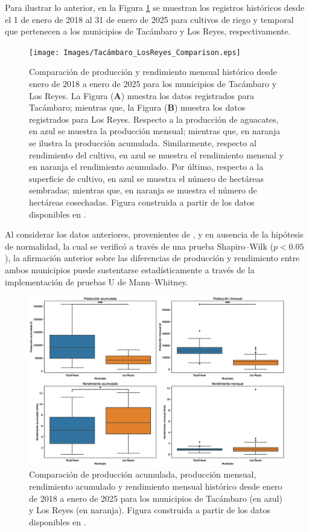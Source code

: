 Para ilustrar lo anterior, en la Figura \ref{fig:Produccion_comparison_TimeSeries} se muestran los registros históricos desde el 1 de enero de 2018 al 31 de enero de 2025 para cultivos de riego y temporal que pertenecen a los municipios de Tacámbaro y Los Reyes, respectivamente.\\

\begin{figure}[!ht]
    \centering
    \texttt{[image: Images/Tacámbaro\_LosReyes\_Comparison.eps]}
    \caption{Comparación de producción y rendimiento mensual histórico desde enero de 2018 a enero de 2025 para los municipios de Tacámbaro y Los Reyes. La Figura (\textbf{A}) muestra los datos registrados para Tacámbaro; mientras que, la Figura (\textbf{B}) muestra los datos registrados para Los Reyes. Respecto a la producción de aguacates, en azul se muestra la producción mensual; mientras que, en naranja se ilustra la producción acumulada. Similarmente, respecto al rendimiento del cultivo, en azul se muestra el rendimiento mensual y en naranja el rendimiento acumulado. Por último, respecto a la superficie de cultivo, en azul se muestra el número de hectáreas sembradas; mientras que, en naranja se muestra el número de hectáreas cosechadas. Figura construida a partir de los datos disponibles en \cite{AvanceSiembrasCosechas}.}
    \label{fig:Produccion_comparison_TimeSeries}
\end{figure}

Al considerar los datos anteriores, provenientes de \cite{AvanceSiembrasCosechas}, y en ausencia de la hipótesis de normalidad, la cual se verificó a través de una prueba Shapiro--Wilk ($p <0.05$), la afirmación anterior sobre las diferencias de producción y rendimiento entre ambos municipios puede sustentarse estadísticamente a través de la implementación de pruebas U de Mann--Whitney.\\

\begin{figure}[!ht]
    \centering
    \includegraphics[width=1\linewidth]{Images/Produccion_statistical_comparison.eps}
    \caption{Comparación de producción acumulada, producción mensual, rendimiento acumulado y rendimiento mensual histórico desde enero de 2018 a enero de 2025 para los municipios de Tacámbaro (en azul) y Los Reyes (en naranja). Figura construida a partir de los datos disponibles en \cite{AvanceSiembrasCosechas}.}
    \label{fig:Produccion_comparison}
\end{figure}

